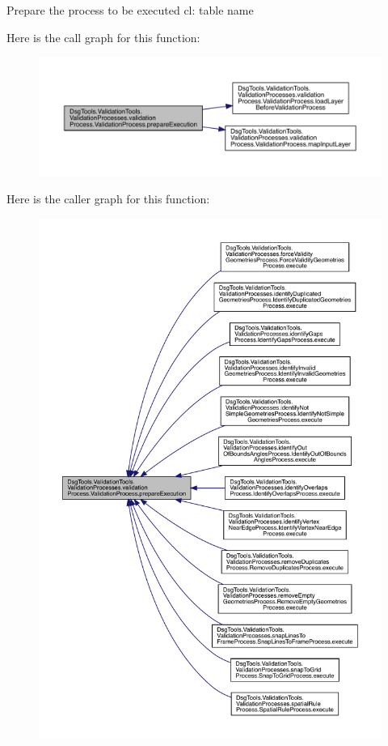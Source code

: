 \begin{DoxyVerb}Prepare the process to be executed
cl: table name
\end{DoxyVerb}
 Here is the call graph for this function\+:
\nopagebreak
\begin{figure}[H]
\begin{center}
\leavevmode
\includegraphics[width=350pt]{class_dsg_tools_1_1_validation_tools_1_1_validation_processes_1_1validation_process_1_1_validation_process_a96fcc66b1ea9c259a30779fa832202c2_cgraph}
\end{center}
\end{figure}
Here is the caller graph for this function\+:
\nopagebreak
\begin{figure}[H]
\begin{center}
\leavevmode
\includegraphics[width=350pt]{class_dsg_tools_1_1_validation_tools_1_1_validation_processes_1_1validation_process_1_1_validation_process_a96fcc66b1ea9c259a30779fa832202c2_icgraph}
\end{center}
\end{figure}
